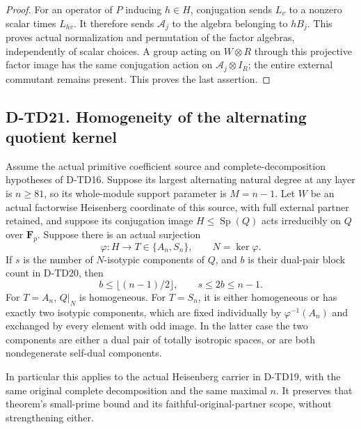 \begin{proof}
For an operator of \(P\) inducing \(h\in H\), conjugation sends
\(L_v\) to a nonzero scalar times \(L_{hv}\). It therefore sends
\(\mathcal A_j\) to the algebra belonging to \(hB_j\).
This proves actual normalization and permutation of the factor
algebras, independently of scalar choices. A group acting on
\(W\otimes R\) through this projective factor image has the same
conjugation action on \(\mathcal A_j\otimes I_R\); the entire
external commutant remains present. This proves the last assertion.
\end{proof}

\subsection*{D-TD21. Homogeneity of the alternating quotient kernel}

\begin{theorem}[D-TD21]
Assume the actual primitive coefficient source and complete-decomposition
hypotheses of D-TD16. Suppose its largest alternating natural degree
at any layer is \(n\ge81\), so its whole-module support parameter
is \(M=n-1\). Let \(W\) be an actual factorwise Heisenberg
coordinate of this source, with full external partner retained, and
suppose its conjugation image \(H\le\operatorname{Sp}(Q)\)
acts irreducibly on \(Q\) over \(\mathbf F_p\). Suppose there is
an actual surjection
\[
             \varphi:H\longrightarrow T\in\{A_n,S_n\},
                    \qquad N=\ker\varphi.
 \tag{TDI.9}
\]
If \(s\) is the number of \(N\)-isotypic components of \(Q\),
and \(b\) is their dual-pair block count in D-TD20, then
\[
                   b\le\lfloor(n-1)/2\rfloor,
                            \qquad s\le2b\le n-1.
 \tag{TDI.10}
\]
For \(T=A_n\), \(Q|_N\) is homogeneous. For \(T=S_n\), it
is either homogeneous or has exactly two isotypic components,
which are fixed individually by \(\varphi^{-1}(A_n)\) and exchanged
by every element with odd image. In the latter case the two
components are either a dual pair of totally isotropic spaces,
or are both nondegenerate self-dual components.

In particular this applies to the actual Heisenberg carrier in
D-TD19, with the same original complete decomposition and the same
maximal \(n\). It preserves that theorem's small-prime bound and
its faithful-original-partner scope, without strengthening either.
\end{theorem}

